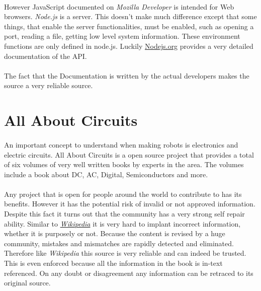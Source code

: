 \documentclass[12pt,a4paper]{report}
\begin{document}
\paragraph{}
However JavaScript documented on \textit{Mozilla Developer} is intended for Web browsers.\textit{ Node.js} is a server. This doesn't make much difference except that some things, that enable the server functionalities, must be enabled, such as opening a port, reading a file, getting low level system information. These environment functions are only defined in node.js. Luckily \href{http://nodejs.org/}{Nodejs.org} provides a very detailed documentation of the API.

\paragraph{}
The fact that the Documentation is written by the actual developers makes the source a very reliable source. 

\section{All About Circuits}

\paragraph{}
An important concept to understand when making robots is electronics and electric circuits. All About Circuits is a open source project that provides a total of six volumes of very well written books by experts in the area. The volumes include a book about DC, AC, Digital, Semiconductors and more.

\paragraph{}
Any project that is open for people around the world to contribute to has its benefits. However it has the potential risk of invalid or not approved information. Despite this fact it turns out that the community has a very strong self repair ability. Similar to \href{http://www.wikipedia.org/}{\textit{Wikipedia}} it is very hard to implant incorrect information, whether it is purposely or not. Because the content is revised by a huge community, mistakes and mismatches are rapidly detected and eliminated. Therefore like\textit{ Wikipedia} this source is very reliable and can indeed be trusted. This is even enforced because all the information in the book is in-text referenced. On any doubt or disagreement any information can be retraced to its original source.
\end{document}
